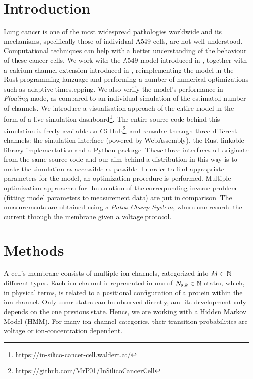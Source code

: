 \documentclass[USenglish,twocolumn]{article}
\begin{document}
  \section{Introduction}
  Lung cancer is one of the most widespread pathologies worldwide and its mechanisms, specifically those of individual A549 cells, are not well understood.
  Computational techniques can help with a better understanding of the behaviour of these cancer cells.
  We work with the A549 model introduced in \cite{2021-A549-model}, together with a calcium channel extension introduced in \cite{2024-calcium-channels}, reimplementing the model in the Rust programming language and performing a number of numerical optimizations such as adaptive timestepping.
  We also verify the model's performance in \textit{Floating} mode, as compared to an individual simulation of the estimated number of channels.
  We introduce a visualisation approach of the entire model in the form of a live simulation dashboard\footnote{\url{https://in-silico-cancer-cell.waldert.at/}}.
  The entire source code behind this simulation is freely available on GitHub\footnote{\url{https://github.com/MrP01/InSilicoCancerCell}}, and reusable through three different channels: the simulation interface (powered by WebAssembly), the Rust linkable library implementation and a Python package.
  These three interfaces all originate from the same source code and our aim behind a distribution in this way is to make the simulation as accessible as possible.
  In order to find appropriate parameters for the model, an optimization procedure is performed.
  Multiple optimization approaches for the solution of the corresponding inverse problem (fitting model parameters to measurement data) are put in comparison.
  The measurements are obtained using a \textit{Patch-Clamp System}, where one records the current through the membrane given a voltage protocol.

  \section{Methods}
  A cell's membrane consists of multiple ion channels, categorized into $M \in \mathbb{N}$ different types.
  Each ion channel is represented in one of $N_{s, k} \in \mathbb{N}$ states, which, in physical terms, is related to a positional configuration of a protein within the ion channel.
  Only some states can be observed directly, and its development only depends on the one previous state.
  Hence, we are working with a Hidden Markov Model (HMM).
  For many ion channel categories, their transition probabilities are voltage or ion-concentration dependent.
\end{document}
